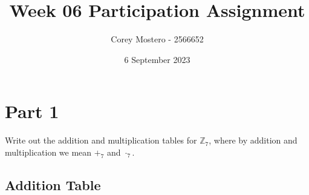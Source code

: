 \documentclass{article}
\title{Week 06 Participation Assignment}
\author{Corey Mostero - 2566652}
\date{6 September 2023}
\begin{document}
\newcommand{\hr}{\par\noindent\rule{\textwidth}{0.4pt}}

\newcommand{\bc}[1]{
	\begin{equation*}
		\begin{boxed}
			{#1}
		\end{boxed}
	\end{equation*}
}

\newcommand{\cond}[2]{
	\ifmmode
	{#1} \quad {#2}
	\else
	$$ {#1} \quad {#2} $$
	\fi
}

\newcommand{\matr}[1]{
	\ifmmode \bm{#1}
	\else \textit{\textbf{#1}}
	\fi
}
\newcommand{\vect}[1]{
	\ifmmode \mathbf{#1}
	\else \textbf{#1}
	\fi
}


\maketitle
\newpage

\tableofcontents

\section{Part 1}

Write out the addition and multiplication tables for $ \mathbb{Z}_7 $, where by addition and multiplication we mean $ +_7 $ and $ \cdot_7 $.

\subsection{Addition Table}
\end{document}
